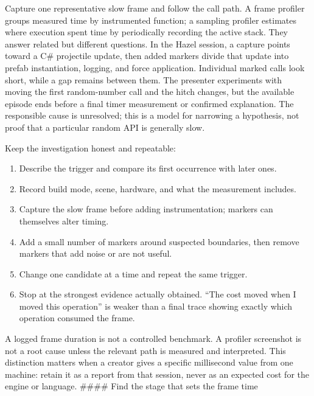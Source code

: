 Capture one representative slow frame and follow the call path. A frame profiler groups measured time by instrumented function; a sampling profiler estimates where execution spent time by periodically recording the active stack. They answer related but different questions. In the Hazel session, a capture points toward a C\# projectile update, then added markers divide that update into prefab instantiation, logging, and force application. Individual marked calls look short, while a gap remains between them. The presenter experiments with moving the first random-number call and the hitch changes, but the available episode ends before a final timer measurement or confirmed explanation. The responsible cause is unresolved; this is a model for narrowing a hypothesis, not proof that a particular random API is generally slow.

Keep the investigation honest and repeatable:

\begin{enumerate}
\def\labelenumi{\arabic{enumi}.}
\tightlist
\item
  Describe the trigger and compare its first occurrence with later ones.
\item
  Record build mode, scene, hardware, and what the measurement includes.
\item
  Capture the slow frame before adding instrumentation; markers can themselves alter timing.
\item
  Add a small number of markers around suspected boundaries, then remove markers that add noise or are not useful.
\item
  Change one candidate at a time and repeat the same trigger.
\item
  Stop at the strongest evidence actually obtained. ``The cost moved when I moved this operation'' is weaker than a final trace showing exactly which operation consumed the frame.
\end{enumerate}

A logged frame duration is not a controlled benchmark. A profiler screenshot is not a root cause unless the relevant path is measured and interpreted. This distinction matters when a creator gives a specific millisecond value from one machine: retain it as a report from that session, never as an expected cost for the engine or language. \#\#\#\# Find the stage that sets the frame time

